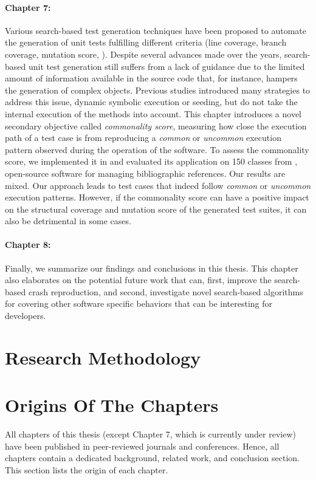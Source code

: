 \paragraph{Chapter 7:}%
Various search-based test generation techniques have been proposed to automate the generation of unit tests fulfilling different criteria (\eg line coverage, branch coverage, mutation score, \etc). Despite several advances made over the years, search-based unit test generation still suffers from a lack of guidance due to the limited amount of information available in the source code that, for instance, hampers the generation of complex objects. Previous studies introduced many strategies to address this issue, \eg dynamic symbolic execution or seeding, but do not take the internal execution of the methods into account.  
This chapter introduces a novel secondary objective called \emph{commonality score}, measuring how close the execution path of a test case is from reproducing a \emph{common} or \emph{uncommon} execution pattern observed during the operation of the software.
To assess the commonality score, we implemented it in \evosuite and evaluated its application on 150 classes from \jabref, open-source software for managing bibliographic references. 
Our results are mixed. Our approach leads to test cases that indeed follow \emph{common} or \emph{uncommon} execution patterns. However, if the commonality score can have a positive impact on the structural coverage and mutation score of the generated test suites, it can also be detrimental in some cases. 

\paragraph{Chapter 8:} 
Finally, we summarize our findings and conclusions in this thesis. This chapter also elaborates on the potential future work that can, first, improve the search-based crash reproduction, and second, investigate novel search-based algorithms for covering other software specific behaviors that can be interesting for developers.



\section{Research Methodology}




\section{Origins Of The Chapters}
All chapters of this thesis (except Chapter 7, which is currently under review) have been published in peer-reviewed journals and conferences. 
Hence, all chapters contain a dedicated background, related work, and conclusion section. 
This section lists the origin of each chapter.


